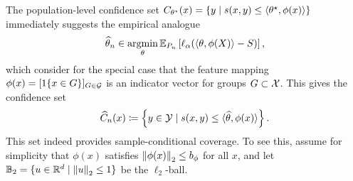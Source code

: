 \documentclass{article}
\newcommand{\radphi}{b_{\phi}}
\newcommand{\loss}{\ell}
\newcommand{\scorefunc}{s}
\newcommand{\scoreval}{\scorefunc}
\newcommand{\scorerv}{S}
\begin{document}
\newcommand{\ballphi}{\ball_\phi}

The population-level confidence set $C_{\theta\opt}(x) = \{y \mid
\scoreval(x, y) \le \<\theta\opt, \phi(x)\>\}$ immediately
suggests the empirical analogue
\begin{equation}
  \what{\theta}_n \in
  \argmin_\theta
  \E_{P_n}\left[\loss_\alpha(\<\theta, \phi(X)\> - \scorerv)\right],
  \label{eqn:empirical-quantile-estimator}
\end{equation}
which \citet{JungNoRaRo23} consider for the special
case that the feature mapping $\phi(x) = [1\!\left\{x \in G\right\}]_{G \in \mathcal{G}}$ is an
indicator vector for groups $G \subset \mathcal{X}$.
%
This gives
the confidence set
\begin{equation*}
  \what{C}_n(x) \defeq \left\{y \in \mc{Y}
  \mid \scoreval(x, y) \le \<\what{\theta}, \phi(x)\> \right\}.
\end{equation*}
%
This set indeed provides sample-conditional
coverage.
%
To see this, assume for simplicity that $\phi(x)$
satisfies $\ltwo{\phi(x)} \le \radphi$ for all $x$,
and let $\mathbb{B}_2 = \{u \in \mathbb{R}^d \mid \left\|{u}\right\|_2 \le 1\}$ be the
$\ell_2$-ball.
\end{document}
